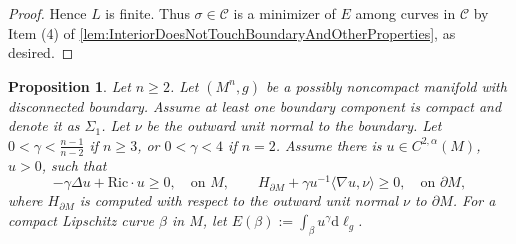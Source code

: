 \documentclass[12pt,a4paper,reqno]{amsart}
\newtheorem{proposition}{Proposition}
\theoremstyle{definition}
\renewcommand{\geq}{\geqslant}
\begin{document}
{{\begin{proof}
Hence $L$ is finite. Thus $\sigma\in\mathcal{C}$ is a minimizer of $E$ among curves in $\mathcal{C}$ by Item (4) of \cref{lem:InteriorDoesNotTouchBoundaryAndOtherProperties}, as desired.
\end{proof}
}

\begin{proposition}\label{propNearbyMinimizer}
     Let $n\geq 2$. Let $(M^n,g)$ be a possibly noncompact manifold with disconnected boundary. Assume at least one boundary component is compact and denote it as $\Sigma_1$. Let $\nu$ be the outward unit normal to the boundary. Let $0<\gamma<\frac{n-1}{n-2}$ if $n\geq 3$, or $0<\gamma<4$ if $n=2$. Assume there is $u\in C^{2,\alpha}(M)$, $u>0$, such that 
        \[
        -\gamma\Delta u+\mathrm{Ric}\cdot u \geq 0, \quad \text{on $M$}, \qquad H_{\partial M}+\gamma u^{-1}\langle \nabla u,\nu\rangle\geq 0, \quad \text{on $\partial M$},
        \]
        where $H_{\partial M}$ is computed with respect to the outward unit normal $\nu$ to $\partial M$. For a compact Lipschitz curve $\beta$ in $M$, let $E(\beta) := \int_\beta u^\gamma \mathrm{d}\ell_g$.


\end{proposition}}
\end{document}

